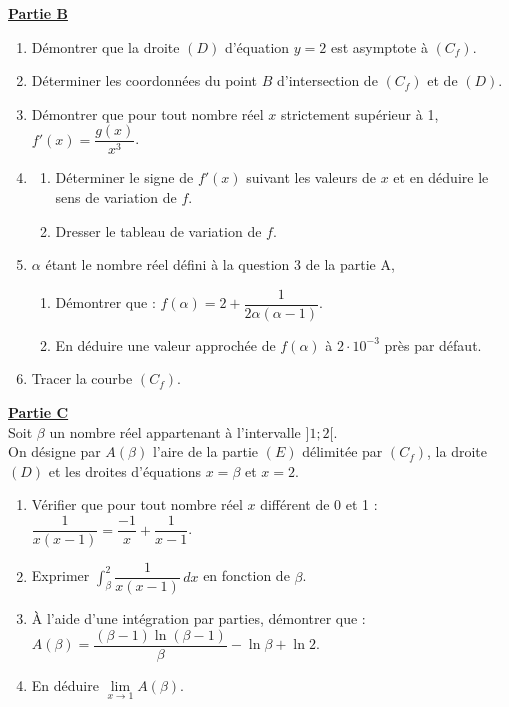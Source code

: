 \documentclass[12pt,a4paper]{article}
\begin{document}
\noindent \underline{\textbf{Partie B}} \\
\begin{enumerate}
    \item Démontrer que la droite $(D)$ d'équation $y = 2$ est asymptote à $(C_f)$.
    \item Déterminer les coordonnées du point $B$ d'intersection de $(C_f)$ et de $(D)$.
    \item Démontrer que pour tout nombre réel $x$ strictement supérieur à 1, $f'(x) = \dfrac{g(x)}{x^3}$.
    \item \begin{enumerate}
        \item Déterminer le signe de $f'(x)$ suivant les valeurs de $x$ et en déduire le sens de variation de $f$.
        \item Dresser le tableau de variation de $f$.
    \end{enumerate}
    \item $\alpha$ étant le nombre réel défini à la question 3 de la partie A,
    \begin{enumerate}
        \item Démontrer que : $f(\alpha) = 2 + \dfrac{1}{2\alpha(\alpha-1)}$.
        \item En déduire une valeur approchée de $f(\alpha)$ à $2 \cdot 10^{-3}$ près par défaut.
    \end{enumerate}
    \item Tracer la courbe $(C_f)$.
\end{enumerate}

\vspace{0.5cm}

\noindent \underline{\textbf{Partie C}} \\
Soit $\beta$ un nombre réel appartenant à l'intervalle $]1; 2[$. \\
On désigne par $A(\beta)$ l'aire de la partie $(E)$ délimitée par $(C_f)$, la droite $(D)$ et les droites d'équations $x = \beta$ et $x = 2$.
\begin{enumerate}
    \item Vérifier que pour tout nombre réel $x$ différent de 0 et 1 : \\
    $\dfrac{1}{x(x-1)} = \dfrac{-1}{x} + \dfrac{1}{x-1}$.
    \item Exprimer $\int_{\beta}^{2} \dfrac{1}{x(x-1)} \, dx$ en fonction de $\beta$.
    \item À l'aide d'une intégration par parties, démontrer que : \\
    $A(\beta) = \dfrac{(\beta-1)\ln(\beta-1)}{\beta} - \ln\beta + \ln 2$.
    \item En déduire $\lim\limits_{x \to 1} A(\beta)$.
\end{enumerate}
\end{document}
